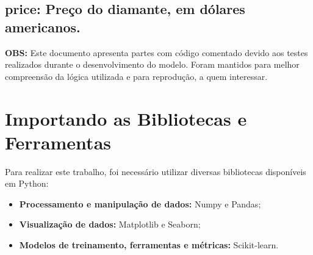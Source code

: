 \documentclass[11pt]{article}
\providecommand{\tightlist}{%
      \setlength{\itemsep}{0pt}\setlength{\parskip}{0pt}}
\begin{document}
\begin{itemize}
{  \subsection{\texorpdfstring{\textbf{price}: Preço do diamante, em
  dólares
  americanos.}{price: Preço do diamante, em dólares americanos.}}\label{price-preuxe7o-do-diamante-em-duxf3lares-americanos.}}

  \textbf{OBS:} Este documento apresenta partes com código comentado
  devido aos testes realizados durante o desenvolvimento do modelo.
  Foram mantidos para melhor compreensão da lógica utilizada e para
  reprodução, a quem interessar.
\end{itemize}

    \hypertarget{importando-as-bibliotecas-e-ferramentas}{%
\section{Importando as Bibliotecas e
Ferramentas}\label{importando-as-bibliotecas-e-ferramentas}}

    Para realizar este trabalho, foi necessário utilizar diversas
bibliotecas disponíveis em Python:

\begin{itemize}
\tightlist
\item
  \textbf{Processamento e manipulação de dados:} Numpy e Pandas;
\item
  \textbf{Visualização de dados:} Matplotlib e Seaborn;
\item
  \textbf{Modelos de treinamento, ferramentas e métricas:} Scikit-learn.
\end{itemize}
\end{document}
